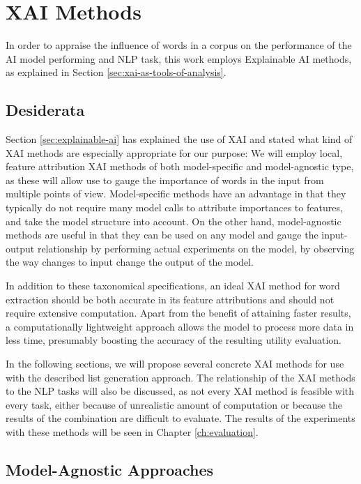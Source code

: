 \section{XAI Methods} \label{sec:xai-methods}
In order to appraise the influence of words in a corpus on the performance of the AI model performing and NLP task, this work employs Explainable AI methods, as explained in Section \ref{sec:xai-as-tools-of-analysis}.

\subsection{Desiderata}
Section \ref{sec:explainable-ai} has explained the use of XAI and stated what kind of XAI methods are especially appropriate for our purpose:
We will employ local, feature attribution XAI methods of both model-specific and model-agnostic type, as these will allow use to gauge the importance of words in the input from multiple points of view.
Model-specific methods have an advantage in that they typically do not require many model calls to attribute importances to features, and take the model structure into account.
On the other hand, model-agnostic methods are useful in that they can be used on any model and gauge the input-output relationship by performing actual experiments on the model, by observing the way changes to input change the output of the model.

In addition to these taxonomical specifications, an ideal XAI method for word extraction should be both accurate in its feature attributions and should not require extensive computation.
Apart from the benefit of attaining faster results, a computationally lightweight approach allows the model to process more data in less time, presumably boosting the accuracy of the resulting utility evaluation.

In the following sections, we will propose several concrete XAI methods for use with the described list generation approach.
The relationship of the XAI methods to the NLP tasks will also be discussed, as not every XAI method is feasible with every task, either because of unrealistic amount of computation or because the results of the combination are difficult to evaluate.
The results of the experiments with these methods will be seen in Chapter \ref{ch:evaluation}.

\subsection{Model-Agnostic Approaches}

